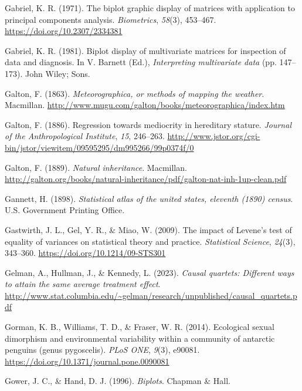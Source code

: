 \documentclass[
  letterpaper,
  10pt,
  krantz2]{krantz}
\newlength{\cslhangindent}
\newenvironment{CSLReferences}[2] %
 {\begin{list}{}{%
  \setlength{\itemindent}{0pt}
  \setlength{\leftmargin}{0pt}
  \setlength{\parsep}{0pt}
  \ifodd #1
   \setlength{\leftmargin}{\cslhangindent}
   \setlength{\itemindent}{-1\cslhangindent}
  \fi
  \setlength{\itemsep}{#2\baselineskip}}}
 {\end{list}}
\begin{document}
\begin{CSLReferences}{1}{0}
Gabriel, K. R. (1971). The biplot graphic display of matrices with
application to principal components analysis. \emph{Biometrics},
\emph{58}(3), 453--467. \url{https://doi.org/10.2307/2334381}

Gabriel, K. R. (1981). Biplot display of multivariate matrices for
inspection of data and diagnosis. In V. Barnett (Ed.),
\emph{Interpreting multivariate data} (pp. 147--173). John Wiley; Sons.

Galton, F. (1863). \emph{Meteorographica, or methods of mapping the
weather}. Macmillan.
\url{http://www.mugu.com/galton/books/meteorographica/index.htm}

Galton, F. (1886). Regression towards mediocrity in hereditary stature.
\emph{Journal of the Anthropological Institute}, \emph{15}, 246--263.
\url{http://www.jstor.org/cgi-bin/jstor/viewitem/09595295/dm995266/99p0374f/0}

Galton, F. (1889). \emph{Natural inheritance}. Macmillan.
\url{http://galton.org/books/natural-inheritance/pdf/galton-nat-inh-1up-clean.pdf}

Gannett, H. (1898). \emph{Statistical atlas of the united states,
eleventh (1890) census}. U.S. Government Printing Office.

Gastwirth, J. L., Gel, Y. R., \& Miao, W. (2009). The impact of
{Levene's} test of equality of variances on statistical theory and
practice. \emph{Statistical Science}, \emph{24}(3), 343--360.
\url{https://doi.org/10.1214/09-STS301}

Gelman, A., Hullman, J., \& Kennedy, L. (2023). \emph{Causal quartets:
Different ways to attain the same average treatment effect}.
\url{http://www.stat.columbia.edu/~gelman/research/unpublished/causal_quartets.pdf}

Gorman, K. B., Williams, T. D., \& Fraser, W. R. (2014). Ecological
sexual dimorphism and environmental variability within a community of
antarctic penguins (genus pygoscelis). \emph{{PLoS} {ONE}}, \emph{9}(3),
e90081. \url{https://doi.org/10.1371/journal.pone.0090081}

Gower, J. C., \& Hand, D. J. (1996). \emph{Biplots}. Chapman \& Hall.


\end{CSLReferences}
\end{document}
